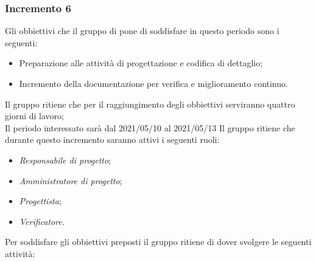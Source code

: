 \subsubsection{Incremento 6}
Gli obbiettivi che il gruppo di pone di soddisfare in questo periodo sono i seguenti:
\begin{itemize}
    \item Preparazione alle attività di progettazione e codifica di dettaglio;
    \item Incremento della documentazione per verifica e miglioramento continuo.
\end{itemize}
Il gruppo ritiene che per il raggiungimento degli obbiettivi serviranno quattro giorni di lavoro;\\
Il periodo interessato sarà dal 2021/05/10 al 2021/05/13
Il gruppo ritiene che durante questo incremento saranno attivi i seguenti ruoli:
\begin{itemize}
    \item \textit{Responsabile di progetto};
    \item \textit{Amministratore di progetto};
    \item \textit{Progettista};
    \item \textit{Verificatore}.
\end{itemize}
Per soddisfare gli obbiettivi preposti il gruppo ritiene di dover svolgere le seguenti attività:
